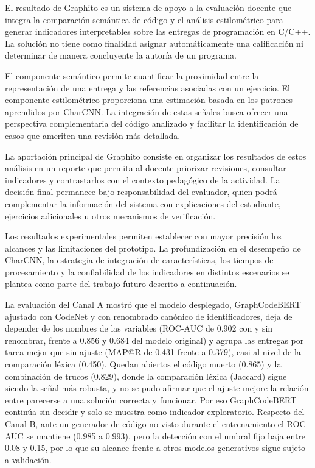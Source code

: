 El resultado de Graphito es un sistema de apoyo a la evaluación docente que integra la comparación semántica de código y el análisis estilométrico para generar indicadores interpretables sobre las entregas de programación en C/C++. La solución no tiene como finalidad asignar automáticamente una calificación ni determinar de manera concluyente la autoría de un programa.

El componente semántico permite cuantificar la proximidad entre la representación de una entrega y las referencias asociadas con un ejercicio. El componente estilométrico proporciona una estimación basada en los patrones aprendidos por CharCNN. La integración de estas señales busca ofrecer una perspectiva complementaria del código analizado y facilitar la identificación de casos que ameriten una revisión más detallada.

La aportación principal de Graphito consiste en organizar los resultados de estos análisis en un reporte que permita al docente priorizar revisiones, consultar indicadores y contrastarlos con el contexto pedagógico de la actividad. La decisión final permanece bajo responsabilidad del evaluador, quien podrá complementar la información del sistema con explicaciones del estudiante, ejercicios adicionales u otros mecanismos de verificación.

Los resultados experimentales permiten establecer con mayor precisión los alcances y las limitaciones del prototipo. La profundización en el desempeño de CharCNN, la estrategia de integración de características, los tiempos de procesamiento y la confiabilidad de los indicadores en distintos escenarios se plantea como parte del trabajo futuro descrito a continuación.

La evaluación del Canal A mostró que el modelo desplegado, GraphCodeBERT ajustado con CodeNet y con renombrado canónico de identificadores, deja de depender de los nombres de las variables (ROC-AUC de 0.902 con y sin renombrar, frente a 0.856 y 0.684 del modelo original) y agrupa las entregas por tarea mejor que sin ajuste (MAP@R de 0.431 frente a 0.379), casi al nivel de la comparación léxica (0.450). Quedan abiertos el código muerto (0.865) y la combinación de trucos (0.829), donde la comparación léxica (Jaccard) sigue siendo la señal más robusta, y no se pudo afirmar que el ajuste mejore la relación entre parecerse a una solución correcta y funcionar. Por eso GraphCodeBERT continúa sin decidir y solo se muestra como indicador exploratorio. Respecto del Canal B, ante un generador de código no visto durante el entrenamiento el ROC-AUC se mantiene (0.985 a 0.993), pero la detección con el umbral fijo baja entre 0.08 y 0.15, por lo que su alcance frente a otros modelos generativos sigue sujeto a validación.

